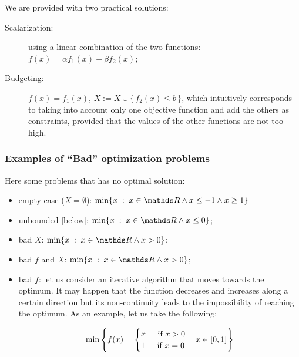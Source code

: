 \documentclass[ComputationalMathematics.tex]{subfiles}
\begin{document}
\newpage
We are provided with two practical solutions:

\begin{description}
  \item[{\sc Scalarization:}] using a linear combination of the two functions: $f(x) = \alpha f_1(x) + \beta f_2(x)$;
  \item[{\sc Budgeting:}] $f(x) = f_1(x)$, $X := X \cup \{ \, f_2(x) \leq b \, \}$, which intuitively corresponds to taking into account only one objective function and add the others as constraints, provided that the values of the other functions are not too high.
\end{description}

\subsubsection{Examples of “Bad” optimization problems}
Here some problems that has no optimal solution:
\begin{itemize}
    \item empty case ($X = \emptyset$): $\min\{ x \; : \; x \in \R \land x \leq -1 \land x \geq 1\}$
    \item unbounded [below]:  $\min\{ x \; : \; x \in \R \land x \leq 0\}$;
    \item bad $X$:  $\min\{ x \; : \; x \in \R \land x > 0\}$;
    \item bad $f$ and  $X$:  $\min\{ x \; : \; x \in \R \land x > 0\}$;
    \item bad $f$: let us consider an iterative algorithm that moves towards the optimum.
It may happen that the function decreases and increases along a certain direction but its non-continuity leads to the impossibility of reaching the optimum.
As an example, let us take the following:

\[
  \min \left\{f(x) =
    \begin{cases}
      x \hspace{0.4cm} \text{ if } x > 0 \\
      1 \hspace{0.4cm} \text{ if } x = 0
    \end{cases}
    x \in [0, 1]\right\}
\]
\end{itemize}
\newpage
\end{document}
